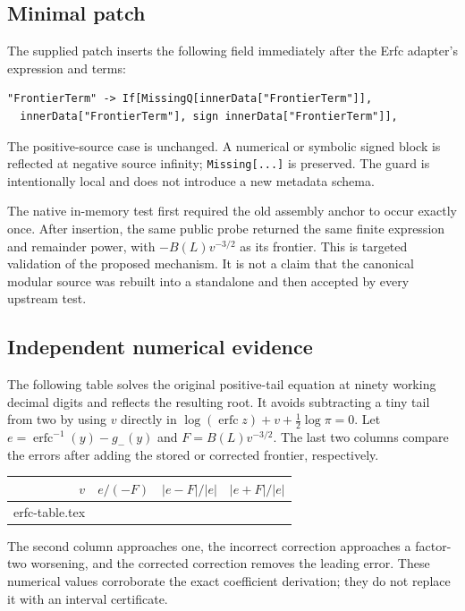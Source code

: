 \documentclass[11pt,a4paper]{article}
\makeatletter
\newcommand{\code}[1]{\nolinkurl{#1}}
\newcommand{\tableinput}[1]{\@@input #1 }
\newcommand{\erfc}{\operatorname{erfc}}
\makeatother
\begin{document}
\subsection{Minimal patch}

The supplied patch inserts the following field immediately after the Erfc
adapter's expression and terms:
\begin{lstlisting}
"FrontierTerm" -> If[MissingQ[innerData["FrontierTerm"]],
  innerData["FrontierTerm"], sign innerData["FrontierTerm"]],
\end{lstlisting}
The positive-source case is unchanged. A numerical or symbolic signed block
is reflected at negative source infinity; \code{Missing[...]} is preserved.
The guard is intentionally local and does not introduce a new metadata schema.

The native in-memory test first required the old assembly anchor to occur
exactly once. After insertion, the same public probe returned the same finite
expression and remainder power, with $-B(L)v^{-3/2}$ as its frontier.
This is targeted validation of the proposed mechanism. It is not a claim that
the canonical modular source was rebuilt into a standalone and then accepted
by every upstream test.

\subsection{Independent numerical evidence}

The following table solves the original positive-tail equation at ninety
working decimal digits and reflects the resulting root. It avoids subtracting
a tiny tail from two by using $v$ directly in
$\log(\erfc z)+v+\tfrac12\log\pi=0$.
Let $e=\erfc^{-1}(y)-g_-(y)$ and $F=B(L)v^{-3/2}$.
The last two columns compare the errors after adding the stored or corrected
frontier, respectively.

\begin{center}
\begin{tabular}{@{}rrrr@{}}
\toprule
$v$ & $e/(-F)$ & $|e-F|/|e|$ & $|e+F|/|e|$\\
\midrule
\tableinput{erfc-table.tex}
\bottomrule
\end{tabular}
\end{center}

The second column approaches one, the incorrect correction approaches a
factor-two worsening, and the corrected correction removes the leading error.
These numerical values corroborate the exact coefficient derivation; they do
not replace it with an interval certificate.
\end{document}
